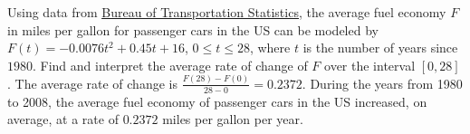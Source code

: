 {Using data from \href{http://www.bts.gov/publications/national_transportation_statistics/html/table_04_23.html}{\underline{Bureau of Transportation Statistics}}, the average fuel economy $F$ in miles per gallon for passenger cars in the US can be modeled by  $F(t) = -0.0076t^2+0.45t + 16$, $0 \leq t \leq 28$, where $t$ is the number of years since $1980$. Find and interpret the average rate of change of $F$ over the interval $[0,28]$.}
{The average rate of change is $\frac{F(28) - F(0)}{28-0}=0.2372$.  During the years from 1980 to 2008, the average fuel economy of passenger cars in the US increased, on average, at a rate of $0.2372$ miles per gallon per year.}